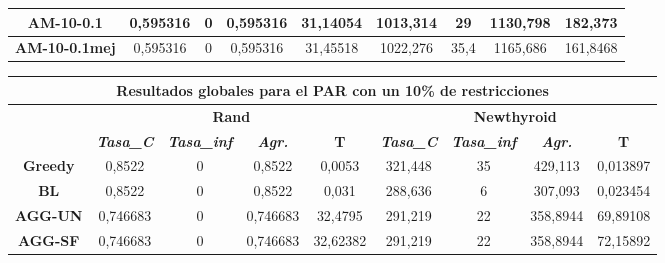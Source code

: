 \documentclass[12pt, spanish]{article}
\begin{document}
\begin{table}[H]
\begin{tabular}{|c|c|c|c|c|c|c|c|c|}
\textbf{AM-10-0.1}    & 0,595316                  & 0                           & 0,595316               & 31,14054   & 1013,314                  & 29                          & 1130,798               & 182,373    \\ \hline
\textbf{AM-10-0.1mej} & 0,595316                  & 0                           & 0,595316               & 31,45518   & 1022,276                  & 35,4                        & 1165,686               & 161,8468   \\ \hline
\end{tabular}
\end{table}


\begin{table}[H]
\footnotesize
\begin{tabular}{|c|c|c|c|c|c|c|c|c|}
\hline
\multicolumn{9}{|c|}{\textbf{Resultados globales para el PAR con un 10\% de restricciones}}                                                                                                                           \\ \hline
\multirow{2}{*}{}     & \multicolumn{4}{c|}{\textbf{Rand}}                                                            & \multicolumn{4}{c|}{\textbf{Newthyroid}}                                                      \\ \cline{2-9} 
                      & \textit{\textbf{Tasa\_C}} & \textit{\textbf{Tasa\_inf}} & \textit{\textbf{Agr.}} & \textbf{T} & \textit{\textbf{Tasa\_C}} & \textit{\textbf{Tasa\_inf}} & \textit{\textbf{Agr.}} & \textbf{T} \\ \hline
\textbf{Greedy}       & 0,8522                    & 0                           & 0,8522                 & 0,0053     & 321,448                   & 35                          & 429,113                & 0,013897   \\ \hline
\textbf{BL}           & 0,8522                    & 0                           & 0,8522                 & 0,031      & 288,636                   & 6                           & 307,093                & 0,023454     \\ \hline
\textbf{AGG-UN}       & 0,746683                  & 0                           & 0,746683               & 32,4795    & 291,219                   & 22                          & 358,8944               & 69,89108   \\ \hline
\textbf{AGG-SF}       & 0,746683                  & 0                           & 0,746683               & 32,62382   & 291,219                   & 22                          & 358,8944               & 72,15892   \\ \hline

\end{tabular}
\end{table}
\end{document}
